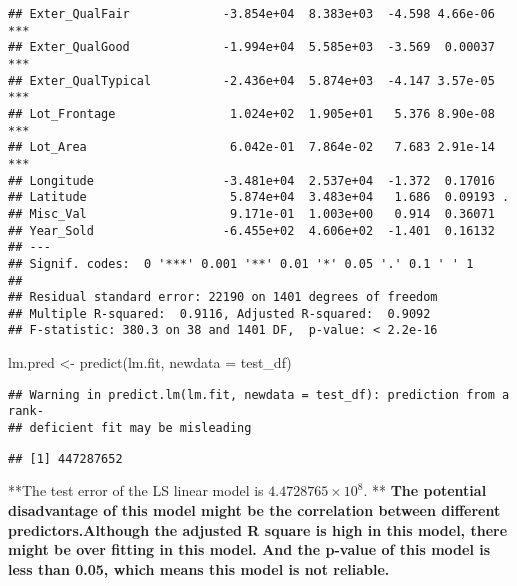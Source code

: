 \documentclass[
]{article}
\newenvironment{Shaded}{\begin{snugshade}}{\end{snugshade}}
\newcommand{\AttributeTok}[1]{\textcolor[rgb]{0.77,0.63,0.00}{#1}}
\newcommand{\CommentTok}[1]{\textcolor[rgb]{0.56,0.35,0.01}{\textit{#1}}}
\newcommand{\DecValTok}[1]{\textcolor[rgb]{0.00,0.00,0.81}{#1}}
\newcommand{\FunctionTok}[1]{\textcolor[rgb]{0.00,0.00,0.00}{#1}}
\newcommand{\NormalTok}[1]{#1}
\newcommand{\OtherTok}[1]{\textcolor[rgb]{0.56,0.35,0.01}{#1}}
\newcommand{\SpecialCharTok}[1]{\textcolor[rgb]{0.00,0.00,0.00}{#1}}
\begin{document}
\begin{verbatim}
## Exter_QualFair             -3.854e+04  8.383e+03  -4.598 4.66e-06 ***
## Exter_QualGood             -1.994e+04  5.585e+03  -3.569  0.00037 ***
## Exter_QualTypical          -2.436e+04  5.874e+03  -4.147 3.57e-05 ***
## Lot_Frontage                1.024e+02  1.905e+01   5.376 8.90e-08 ***
## Lot_Area                    6.042e-01  7.864e-02   7.683 2.91e-14 ***
## Longitude                  -3.481e+04  2.537e+04  -1.372  0.17016    
## Latitude                    5.874e+04  3.483e+04   1.686  0.09193 .  
## Misc_Val                    9.171e-01  1.003e+00   0.914  0.36071    
## Year_Sold                  -6.455e+02  4.606e+02  -1.401  0.16132    
## ---
## Signif. codes:  0 '***' 0.001 '**' 0.01 '*' 0.05 '.' 0.1 ' ' 1
## 
## Residual standard error: 22190 on 1401 degrees of freedom
## Multiple R-squared:  0.9116, Adjusted R-squared:  0.9092 
## F-statistic: 380.3 on 38 and 1401 DF,  p-value: < 2.2e-16
\end{verbatim}

\begin{Shaded}
\begin{Highlighting}[]
\NormalTok{lm.pred }\OtherTok{\textless{}{-}} \FunctionTok{predict}\NormalTok{(lm.fit, }\AttributeTok{newdata =}\NormalTok{ test\_df)}
\end{Highlighting}
\end{Shaded}

\begin{verbatim}
## Warning in predict.lm(lm.fit, newdata = test_df): prediction from a rank-
## deficient fit may be misleading
\end{verbatim}

\begin{Shaded}
\end{Shaded}

\begin{verbatim}
## [1] 447287652
\end{verbatim}

**The test error of the LS linear model is
\ensuremath{4.4728765\times 10^{8}}. ** \textbf{The potential
disadvantage of this model might be the correlation between different
predictors.Although the adjusted R square is high in this model, there
might be over fitting in this model. And the p-value of this model is
less than 0.05, which means this model is not reliable.}
\end{document}
